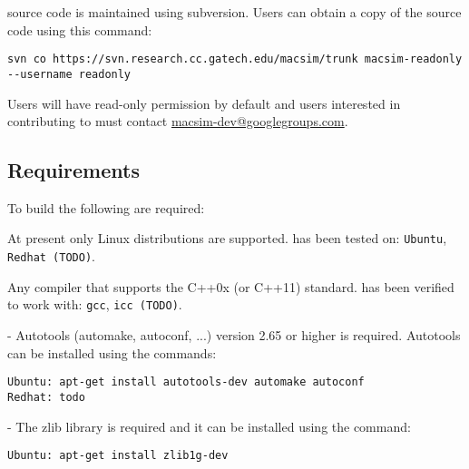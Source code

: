 \SIM source code is maintained using subversion. Users can obtain a copy of the
source code using this command:

\begin{Verbatim}
svn co https://svn.research.cc.gatech.edu/macsim/trunk macsim-readonly --username readonly
\end{Verbatim}

\noindent

Users will have read-only permission by default and users interested in
contributing to \SIM must contact
\href{mailto:macsim-dev@googlegroups.com}{macsim-dev@googlegroups.com}.



\subsection{Requirements}

To build \SIM the following are required:

\begingroup
\renewcommand\descriptionlabel[1]{\textit{\hspace\labelsep{#1}}}
\begin{description}\firmlist
  \item[Operating System] At present only Linux distributions are supported. \SIM has been tested on:
   \Verb+Ubuntu+, \Verb+Redhat (TODO)+.
  \item[Compiler] Any compiler that supports the C++0x (or C++11)
    standard. \SIM has been verified to work with: \Verb+gcc+, \Verb+icc (TODO)+. 
  \item[Autotools] - Autotools (automake, autoconf,
    ...) version 2.65 or higher is required. Autotools can be installed using the commands:
\begin{Verbatim}
Ubuntu: apt-get install autotools-dev automake autoconf
Redhat: todo
\end{Verbatim}
  \item[Libraries] - The zlib library is required and it can be installed using the command:
\begin{Verbatim}
Ubuntu: apt-get install zlib1g-dev
\end{Verbatim}
\end{description}
\endgroup




